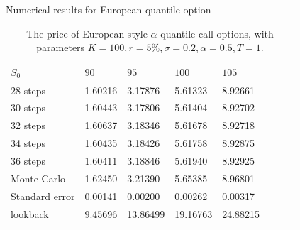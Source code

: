 \documentclass[cjk,10pt]{beamer}
\begin{document}
\begin{frame}{Numerical results for European quantile option}
\begin{table}
\caption{The price of European-style $\alpha$-quantile call options, with parameters
	$K=100, r=5\%, \sigma=0.2, \alpha=0.5, T=1$. }
\begin{center}
\begin{tabular}{l|lllllll}
 $S_0$ & $90$ & $95$ & $100$ & $105$ \\
\hline
28 steps & 1.60216 & 3.17876 & 5.61323 & 8.92661\\
30 steps & 1.60443 & 3.17806 & 5.61404 & 8.92702\\
32 steps & 1.60637 & 3.18346 & 5.61678 & 8.92718\\ 
34 steps & 1.60435 & 3.18426 & 5.61758 & 8.92875\\
36 steps & 1.60411 & 3.18846 & 5.61940 & 8.92925\\
\hline
Monte Carlo & 1.62450 & 3.21390 &  5.65385 & 8.96801 \\
Standard error & 0.00141 & 0.00200 & 0.00262 & 0.00317 \\
\hline
lookback & 9.45696 & 13.86499 & 19.16763 & 24.88215
\end{tabular}
\end{center}
\label{fig:euro5}
\end{table}%
\end{frame}

\end{document}
